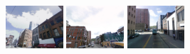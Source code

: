 \begin{minipage}{0.75\linewidth}
\begin{minipage}{\linewidth}
        \colorbox{myGreen}{\includegraphics[height=16mm]{imgs/ex4/FV2.jpg}}
        \colorbox{myRed}{\includegraphics[height=16mm]{imgs/ex4/FV3.jpg}}
        \colorbox{myRed}{\includegraphics[height=16mm]{imgs/ex4/FV4.jpg}}
    \end{minipage} 
\end{minipage}
